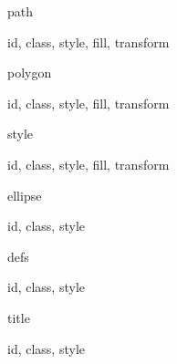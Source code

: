 \documentclass{article}
\begin{document}
\begin{Element}{path}
    \begin{Required}
    \end{Required}
    \begin{Optional}
        id, class, style, fill, transform
    \end{Optional}
\end{Element}

\begin{Element}{polygon}
    \begin{Required}
    \end{Required}
    \begin{Optional}
        id, class, style, fill, transform
    \end{Optional}
\end{Element}

\begin{Element}{style}
    \begin{Required}
    \end{Required}
    \begin{Optional}
        id, class, style, fill, transform
    \end{Optional}
\end{Element}

\begin{Element}{ellipse}
    \begin{Required}
    \end{Required}
    \begin{Optional}
        id, class, style
    \end{Optional}
\end{Element}

\begin{Element}{defs}
    \begin{Optional}
        id, class, style
    \end{Optional}
\end{Element}

\begin{Element}{title}
    \begin{Required}
    \end{Required}
    \begin{Optional}
        id, class, style
    \end{Optional}
\end{Element}
\end{document}
